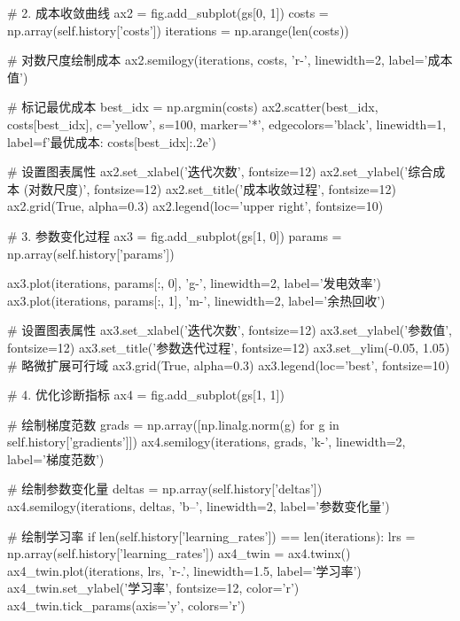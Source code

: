 \documentclass[a4paper,12pt]{article}
\begin{document}
\begin{python}
        # 2. 成本收敛曲线
        ax2 = fig.add_subplot(gs[0, 1])
        costs = np.array(self.history['costs'])
        iterations = np.arange(len(costs))
        
        # 对数尺度绘制成本
        ax2.semilogy(iterations, costs, 'r-', linewidth=2, label='成本值')
        
        # 标记最优成本
        best_idx = np.argmin(costs)
        ax2.scatter(best_idx, costs[best_idx], c='yellow', s=100, marker='*', 
                   edgecolors='black', linewidth=1, label=f'最优成本: {costs[best_idx]:.2e}')
        
        # 设置图表属性
        ax2.set_xlabel('迭代次数', fontsize=12)
        ax2.set_ylabel('综合成本 (对数尺度)', fontsize=12)
        ax2.set_title('成本收敛过程', fontsize=12)
        ax2.grid(True, alpha=0.3)
        ax2.legend(loc='upper right', fontsize=10)
        
        # 3. 参数变化过程
        ax3 = fig.add_subplot(gs[1, 0])
        params = np.array(self.history['params'])
        
        ax3.plot(iterations, params[:, 0], 'g-', linewidth=2, label='发电效率')
        ax3.plot(iterations, params[:, 1], 'm-', linewidth=2, label='余热回收')
        
        # 设置图表属性
        ax3.set_xlabel('迭代次数', fontsize=12)
        ax3.set_ylabel('参数值', fontsize=12)
        ax3.set_title('参数迭代过程', fontsize=12)
        ax3.set_ylim(-0.05, 1.05)  # 略微扩展可行域
        ax3.grid(True, alpha=0.3)
        ax3.legend(loc='best', fontsize=10)
        
        # 4. 优化诊断指标
        ax4 = fig.add_subplot(gs[1, 1])
        
        # 绘制梯度范数
        grads = np.array([np.linalg.norm(g) for g in self.history['gradients']])
        ax4.semilogy(iterations, grads, 'k-', linewidth=2, label='梯度范数')
        
        # 绘制参数变化量
        deltas = np.array(self.history['deltas'])
        ax4.semilogy(iterations, deltas, 'b--', linewidth=2, label='参数变化量')
        
        # 绘制学习率
        if len(self.history['learning_rates']) == len(iterations):
            lrs = np.array(self.history['learning_rates'])
            ax4_twin = ax4.twinx()
            ax4_twin.plot(iterations, lrs, 'r-.', linewidth=1.5, label='学习率')
            ax4_twin.set_ylabel('学习率', fontsize=12, color='r')
            ax4_twin.tick_params(axis='y', colors='r')
        

\end{python}
\end{document}
